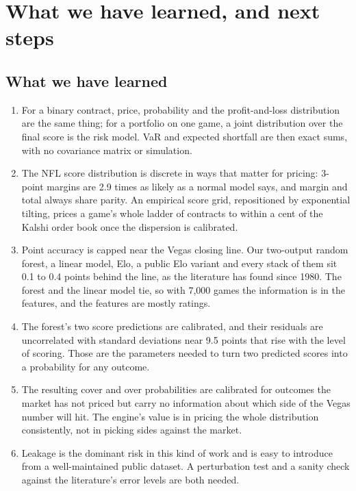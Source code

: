 \section{What we have learned, and next steps}

\subsection{What we have learned}
\begin{enumerate}[nosep]
\item For a binary contract, price, probability and the profit-and-loss distribution are the same thing; for a portfolio on one game, a joint distribution over the final score is the risk model. VaR and expected shortfall are then exact sums, with no covariance matrix or simulation.
\item The NFL score distribution is discrete in ways that matter for pricing: 3-point margins are 2.9 times as likely as a normal model says, and margin and total always share parity. An empirical score grid, repositioned by exponential tilting, prices a game's whole ladder of contracts to within a cent of the Kalshi order book once the dispersion is calibrated.
\item Point accuracy is capped near the Vegas closing line. Our two-output random forest, a linear model, Elo, a public Elo variant and every stack of them sit 0.1 to 0.4 points behind the line, as the literature has found since 1980. The forest and the linear model tie, so with 7,000 games the information is in the features, and the features are mostly ratings.
\item The forest's two score predictions are calibrated, and their residuals are uncorrelated with standard deviations near 9.5 points that rise with the level of scoring. Those are the parameters needed to turn two predicted scores into a probability for any outcome.
\item The resulting cover and over probabilities are calibrated for outcomes the market has not priced but carry no information about which side of the Vegas number will hit. The engine's value is in pricing the whole distribution consistently, not in picking sides against the market.
\item Leakage is the dominant risk in this kind of work and is easy to introduce from a well-maintained public dataset. A perturbation test and a sanity check against the literature's error levels are both needed.
\end{enumerate}

